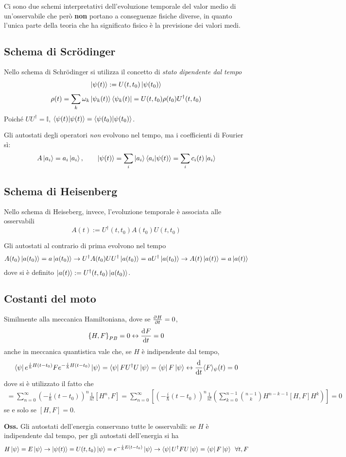 Ci sono due schemi interpretativi dell'evoluzione temporale del valor medio di un'osservabile che
però \textbf{non} portano a conseguenze fisiche diverse, in quanto l'unica parte della teoria che ha
significato fisico è la previsione dei valori medi.
\subsection{Schema di Scrödinger}
Nello schema di Schrödinger si utilizza il concetto di \textit{stato dipendente dal tempo}
\begin{gather*}
\ket{\psi(t)}:=U(t,t_0)\ket{\psi(t_0)}\\
\rho(t)=\sum_{k}^{}\omega_k\ket{\psi_k(t)}\bra{\psi_k(t)} = U(t,t_0)\rho(t_0)U^{\dagger}(t,t_0)
\end{gather*}
Poiché $UU^{\dagger}=\mathbb{I}$, $\bra{\psi(t)}\ket{\psi(t)} = \bra{\psi(t_0)}\ket{\psi(t_0)}$.

Gli autostati degli operatori \textit{non} evolvono nel tempo, ma i coefficienti di Fourier sì:
$$A\ket{a_i}=a_i\ket{a_i},\quad\quad\ket{\psi(t)} = \sum_{i}\ket{a_i}\bra{a_i}\ket{\psi(t)} =
\sum_{i}c_i(t)\ket{a_i}$$

\subsection{Schema di Heisenberg}
Nello schema di Heiseberg, invece, l'evoluzione temporale è associata alle osservabili
$$A(t):=U^\dagger(t,t_0) A(t_0)U(t,t_0)$$

Gli autostati al contrario di prima evolvono nel tempo
$$A(t_0)\ket{a(t_0)}=a\ket{a(t_0)}\rightarrow
U^\dagger A(t_0)UU^\dagger\ket{a(t_0)}=a U^\dagger\ket{a(t_0)}\rightarrow
A(t)\ket{a(t)} = a\ket{a(t)}$$
dove si è definito $\ket{a(t)}:=U^\dagger(t,t_0)\ket{a(t_0)}$.
\subsection{Costanti del moto}
Similmente alla meccanica Hamiltoniana, dove se $\pdv[]{H}{t}=0$,
$$\left\{H,F\right\}_{PB}=0\leftrightarrow\dv[]{F}{t}=0$$
anche in meccanica quantistica vale che, se $H$ è indipendente dal tempo,
$$\bra{\psi}e^{\frac{i}{\hbar}H(t-t_0)} Fe^{-\frac{i}{\hbar}H(t-t_0)}\ket{\psi} = 
\bra{\psi}FU^\dagger U\ket{\psi} = \bra{\psi}F\ket{\psi} \leftrightarrow
\dv[]{}{t}\langle F\rangle_\psi(t)=0
$$
dove si è utilizzato il fatto che 
\begin{gather*}
[U,F]=\sum_{n=0}^{\infty}\left(-\frac{i}{\hbar}(t-t_0)\right)^n\frac{1}{n!}[H^n,F]
=\sum_{n=0}^{\infty}\left[\left(-\frac{i}{\hbar}(t-t_0)\right)^n\frac{1}{n!}
\left(\sum_{k=0}^{n-1}{n-1\choose k}H^{n-k-1}[H,F]H^{k}\right)\right]=0
\end{gather*}
se e solo se $[H,F] = 0$.

\textbf{Oss.} Gli autostati dell'energia conservano tutte le osservabili:
se $H$ è indipendente dal tempo, per gli autostati dell'energia si ha
$$H\ket{\psi}=E\ket{\psi} \rightarrow \ket{\psi(t)}=U(t,t_0)\ket{\psi} = e^{-\frac{i}{\hbar}E(t-t_0)}
\ket{\psi} \rightarrow \bra{\psi}U^\dagger FU\ket{\psi} = \bra{\psi}F\ket{\psi}\mkern9mu\forall t,F$$
